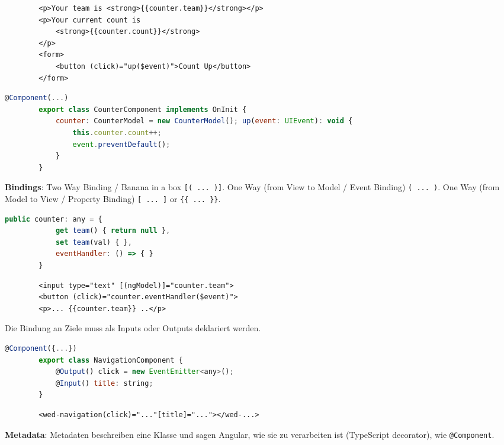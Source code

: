 \documentclass[10pt,landscape]{article}
\begin{document}
\begin{multicols}{2}
        \begin{lstlisting}
        <p>Your team is <strong>{{counter.team}}</strong></p>
        <p>Your current count is
            <strong>{{counter.count}}</strong>
        </p>
        <form>
            <button (click)="up($event)">Count Up</button>
        </form>
       \end{lstlisting}\begin{lstlisting}[language=JavaScript]
        @Component(...)
        export class CounterComponent implements OnInit {
            counter: CounterModel = new CounterModel(); up(event: UIEvent): void {
                this.counter.count++;
                event.preventDefault();
            }
        }
        \end{lstlisting}

        \textbf{Bindings}: Two Way Binding / Banana in a box \lstinline[mathescape]![( ... )]!.
        One Way (from View to Model / Event Binding) \lstinline{( ... )}.
        One Way (from Model to View / Property Binding) \lstinline{[ ... ]} or \lstinline[mathescape]!{{ ... }}!.

        \begin{lstlisting}[language=JavaScript]
        public counter: any = {
            get team() { return null },
            set team(val) { },
            eventHandler: () => { }
        }
        \end{lstlisting}\begin{lstlisting}
        <input type="text" [(ngModel)]="counter.team">
        <button (click)="counter.eventHandler($event)">
        <p>... {{counter.team}} ..</p>
        \end{lstlisting}

        Die Bindung an Ziele muss als Inputs oder Outputs deklariert werden.

        \begin{lstlisting}[language=JavaScript]
        @Component({...})
        export class NavigationComponent {
            @Output() click = new EventEmitter<any>();
            @Input() title: string;
        }
        \end{lstlisting}\begin{lstlisting}
        <wed-navigation(click)="..."[title]="..."></wed-...>
        \end{lstlisting}

        \textbf{Metadata}: Metadaten beschreiben eine Klasse und sagen Angular, wie sie zu verarbeiten ist (TypeScript decorator), wie \lstinline{@Component}.


\end{multicols}
\end{document}
